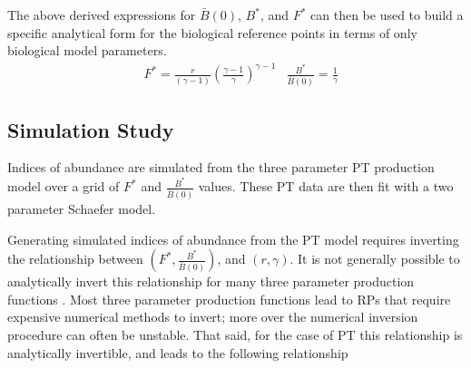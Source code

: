 \documentclass[12pt]{article}
\begin{document}
{%
The above derived expressions for $\bar B(0)$, $B^*$, and $F^*$ can then be used to 
build a specific analytical form for the biological reference points in terms of only 
biological model parameters.
\begin{align}
&F^* = \frac{r}{(\gamma-1)} \left(\frac{\gamma-1}{\gamma}\right)^{\gamma-1}
&\frac{B^*}{\bar B(0)} = \frac{1}{\gamma} %
\end{align}


\subsection{Simulation Study \label{sim}}

%
Indices of abundance are simulated from the three parameter PT production model 
over a grid of $F^*$ and $\frac{B^*}{\bar B(0)}$ values. These PT data are then 
fit with a two parameter Schaefer model. 

%
% 

Generating simulated indices of abundance from the PT model requires 
inverting the relationship between $\left(F^*, \frac{B^*}{\bar B(0)}\right)$, and 
$(r, \gamma)$. It is not generally possible to analytically invert this 
relationship for many three parameter production functions . %
Most three parameter production functions lead to RPs that require expensive 
numerical methods to invert; more over the numerical inversion procedure can %
often be unstable. That said, for the case of PT this relationship is 
analytically invertible, and leads to the following relationship

}
\end{document}

